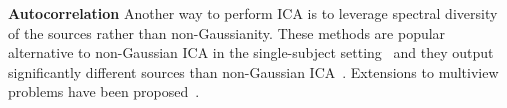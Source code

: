 \textbf{Autocorrelation} Another way to perform ICA is to leverage spectral diversity of the sources rather than non-Gaussianity.
%
These methods are popular alternative to non-Gaussian ICA in the single-subject setting~\cite{tong1991indeterminacy, belouchrani1997blind, pham1997blind} and they output significantly different sources than non-Gaussian ICA~\cite{delorme2012independent}.
%
Extensions to multiview problems have been proposed~\cite{lukic2002ica, congedo2010group}.
\vspace{-5pt}
%
%
%

